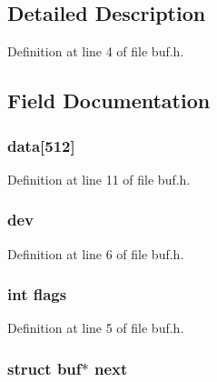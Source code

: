 \subsection{Detailed Description}


Definition at line 4 of file buf.\-h.



\subsection{Field Documentation}
\hypertarget{structbuf_aa6cf955e5b0bdedd2b7d1461838a1134}{
\subsubsection[{data}]{ data\mbox{[}512\mbox{]}}}\label{structbuf_aa6cf955e5b0bdedd2b7d1461838a1134}


Definition at line 11 of file buf.\-h.

\hypertarget{structbuf_aaf61a1db4c34c23857104abc633d8ee6}{
\subsubsection[{dev}]{ dev}}\label{structbuf_aaf61a1db4c34c23857104abc633d8ee6}


Definition at line 6 of file buf.\-h.

\hypertarget{structbuf_ac8bf36fe0577cba66bccda3a6f7e80a4}{
\subsubsection[{flags}]{\setlength{\rightskip}{0pt plus 5cm}int flags}}\label{structbuf_ac8bf36fe0577cba66bccda3a6f7e80a4}


Definition at line 5 of file buf.\-h.

\hypertarget{structbuf_a5a609449f1b0b08ae96fe8b29e866fd7}{
\subsubsection[{next}]{\setlength{\rightskip}{0pt plus 5cm}struct {\bf buf}$\ast$ next}}\label{structbuf_a5a609449f1b0b08ae96fe8b29e866fd7}


